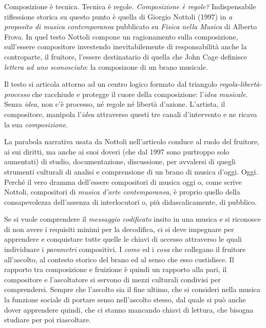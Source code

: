 Composizione è tecnica. Tecnica è regole. \emph{Composizione è regole?} Indispensabile
riflessione storica su questo punto è quella di Giorgio Nottoli (1997) in
\emph{a proposito di musica contemporanea} pubblicato su \emph{Fisica nella Musica}
di Alberto Frova. In quel testo Nottoli compone un ragionamento sulla composizione,
sull'essere compositore investendo inevitabilemente di responsabilità anche la
controparte, il fruitore, l'essere destinatario di quella che John Cage definisce
\emph{lettera ad uno sconosciuto}: la composizone di un brano musicale.

Il testo si articola attorno ad un centro logico formato dal triangolo
\emph{regola-libertà-processo} che racchiude e protegge il cuore della composizione:
l'\emph{idea musicale}. Senza \emph{idea}, non c'è processo, né regole né
libertà d'azione. L'artista, il compositore, manipola l'\emph{idea} attraverso
questi tre canali d'intervento e ne ricava la sua \emph{composizione}.

La parabola narrativa usata da Nottoli nell'articolo conduce al ruolo del fruitore,
ai sui diritti, ma anche ai suoi doveri (che dal 1997 sono purtroppo solo aumentati)
di studio, documentazione, discussione, per avvalersi di quegli strumenti culturali di analisi e
comprensione di un brano di musica d'oggi. Oggi. Perché il vero dramma
dell'essere compositori di musica oggi o, come scrive Nottoli, compositori di
\emph{musica d'arte contemporanea}, è proprio quello della consapevolezza
dell'assenza di interlocutori o, più didascalicamente, di pubblico.

Se si vuole comprendere il \emph{messaggio codificato} insito in una musica e
si riconosce di non avere i requisiti minimi per la decodifica, ci si deve
impegnare per apprendere e conquistare tutte quelle le chiavi di accesso
attraverso le quali individuare i \emph{parametri} compositivi.
I \emph{come} ed i \emph{cosa} che collegano il fruitore all'ascolto, al
contesto storico del brano ed al senso che esso custidisce. Il
rapporto tra composizione e fruizione è quindi un rapporto alla pari, il
compositore e l'ascoltatore si servono di mezzi culturali condivisi per comprendersi.
Sempre che l'ascolto sia il fine ultimo, che si consideri nella musica la funzione
sociale di portare senso nell'ascolto stesso, dal quale si può anche dover
apprendere quindi, che ci stanno mancando chiavi di lettura, che bisogna studiare per
poi riascoltare.

